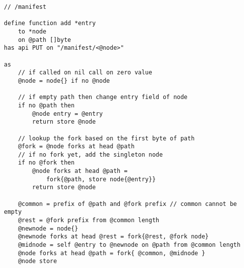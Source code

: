 \begin{definition}\label{def:manifest-update}
\begin{lstlisting}[language=buzz1]
// /manifest

define function add *entry  
    to *node 
    on @path []byte 
has api PUT on "/manifest/<@node>"
    
as
    // if called on nil call on zero value
    @node = node{} if no @node 

    // if empty path then change entry field of node
    if no @path then
        @node entry = @entry
        return store @node

    // lookup the fork based on the first byte of path
    @fork = @node forks at head @path
    // if no fork yet, add the singleton node 
    if no @fork then
        @node forks at head @path =
            fork{@path, store node{@entry}}
        return store @node

    @common = prefix of @path and @fork prefix // common cannot be empty
    @rest = @fork prefix from @common length
    @newnode = node{}
    @newnode forks at head @rest = fork{@rest, @fork node}
    @midnode = self @entry to @newnode on @path from @common length 
    @node forks at head @path = fork{ @common, @midnode } 
    @node store
    

\end{lstlisting}
\end{definition}

